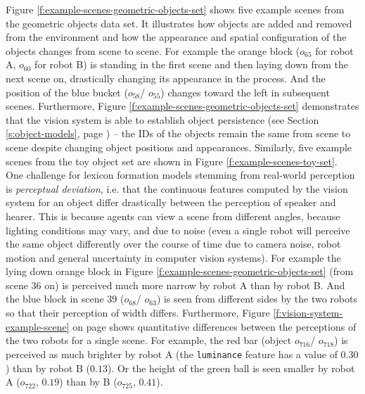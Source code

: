 Figure \ref{f:example-scenes-geometric-objects-set} shows five example
scenes from the geometric objects data set. It illustrates how objects
are added and removed from the environment and how the appearance and
spatial configuration of the objects changes from scene to scene. For
example the orange block ($o_{65}$ for robot A, $o_{60}$ for robot B)
is standing in the first scene and then laying down from the next
scene on, drastically changing its appearance in the process. And the
position of the blue bucket ($o_{58}$/ $o_{55}$) changes toward the
left in subsequent scenes. Furthermore, Figure
\ref{f:example-scenes-geometric-objects-set} demonstrates that the
vision system is able to establish object persistence (see Section
\ref{s:object-models}, page \pageref{s:object-models}) -- the IDs of
the objects remain the same from scene to scene despite changing
object positions and appearances. Similarly, five example scenes from
the toy object set are shown in Figure \ref{f:example-scenes-toy-set}.\\



\noindent One challenge for lexicon formation models stemming from real-world
perception is \emph{perceptual deviation}, i.e. that the continuous
features computed by the vision system for an object differ
drastically between the perception of speaker and hearer. This is
because agents can view a scene from different angles, because
lighting conditions may vary, and due to noise (even a single robot
will perceive the same object differently over the course of time due
to camera noise, robot motion and general uncertainty in computer
vision systems). For example the lying down orange block in Figure
\ref{f:example-scenes-geometric-objects-set} (from scene 36 on) is
perceived much more narrow by robot A than by robot B. And the blue
block in scene 39 ($o_{68}$/ $o_{63}$) is seen from different sides by
the two robots so that their perception of width differs. Furthermore,
Figure \ref{f:vision-system-example-scene} on page
\pageref{f:vision-system-example-scene} shows quantitative differences
between the perceptions of the two robots for a single scene. For
example, the red bar (object $o_{716}$/ $o_{718}$) is perceived as
much brighter by robot A (the \texttt{luminance} feature has a value
of $0.30$) than by robot B ($0.13$). Or the height of the green ball is
seen smaller by robot A ($o_{722}$, $0.19$) than by B ($o_{725}$, $0.41$).


